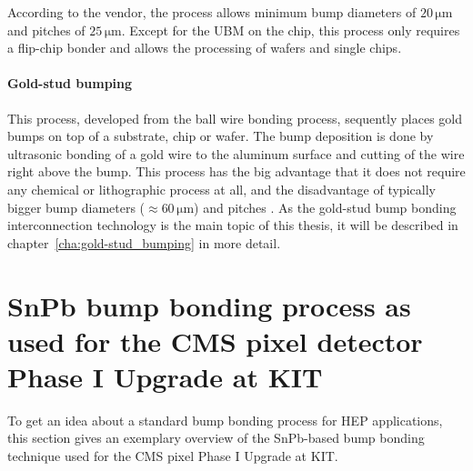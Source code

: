 According to the vendor, the process allows minimum bump diameters of $20\,\si{\micro \meter}$ and pitches of $25\,\si{\micro \meter}$. Except for the \ac{UBM} on the chip, this process only requires a flip-chip bonder and allows the processing of wafers and single chips.

\paragraph*{Gold-stud bumping}
This process, developed from the ball wire bonding process, sequently places gold bumps on top of a substrate, chip or wafer. The bump deposition is done by ultrasonic bonding of a gold wire to the aluminum surface and cutting of the wire right above the bump. This process has the big advantage that it does not require any chemical or lithographic process at all, and the disadvantage of typically bigger bump diameters ($\approx 60\,\si{\micro \meter}$) and pitches \cite{Tri10}. As the gold-stud bump bonding interconnection technology is the main topic of this thesis, it will be described in chapter~\ref{cha:gold-stud_bumping} in more detail.



\section[SnPb bump bonding process at \acs{KIT}]{SnPb bump bonding process as used for the \ac{CMS} pixel detector Phase I Upgrade at \acs{KIT}}\label{sec:KIT_bump_bonding}
To get an idea about a standard bump bonding process for \ac{HEP} applications, this section gives an exemplary overview of the SnPb-based bump bonding technique used for the \ac{CMS} pixel Phase I Upgrade at \ac{KIT}.


